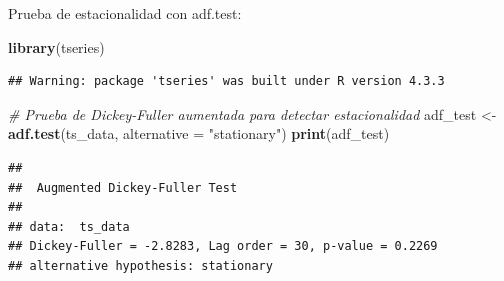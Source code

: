 \documentclass[
]{book}
\newenvironment{Shaded}{\begin{snugshade}}{\end{snugshade}}
\newcommand{\AttributeTok}[1]{\textcolor[rgb]{0.13,0.29,0.53}{#1}}
\newcommand{\CommentTok}[1]{\textcolor[rgb]{0.56,0.35,0.01}{\textit{#1}}}
\newcommand{\FunctionTok}[1]{\textcolor[rgb]{0.13,0.29,0.53}{\textbf{#1}}}
\newcommand{\NormalTok}[1]{#1}
\newcommand{\OtherTok}[1]{\textcolor[rgb]{0.56,0.35,0.01}{#1}}
\newcommand{\StringTok}[1]{\textcolor[rgb]{0.31,0.60,0.02}{#1}}
\begin{document}
Prueba de estacionalidad con adf.test:

\begin{Shaded}
\begin{Highlighting}[]
\FunctionTok{library}\NormalTok{(tseries)}
\end{Highlighting}
\end{Shaded}

\begin{verbatim}
## Warning: package 'tseries' was built under R version 4.3.3
\end{verbatim}

\begin{Shaded}
\begin{Highlighting}[]
\CommentTok{\# Prueba de Dickey{-}Fuller aumentada para detectar estacionalidad}
\NormalTok{adf\_test }\OtherTok{\textless{}{-}} \FunctionTok{adf.test}\NormalTok{(ts\_data, }\AttributeTok{alternative =} \StringTok{"stationary"}\NormalTok{)}
\FunctionTok{print}\NormalTok{(adf\_test)}
\end{Highlighting}
\end{Shaded}

\begin{verbatim}
## 
##  Augmented Dickey-Fuller Test
## 
## data:  ts_data
## Dickey-Fuller = -2.8283, Lag order = 30, p-value = 0.2269
## alternative hypothesis: stationary
\end{verbatim}

  
\end{document}
